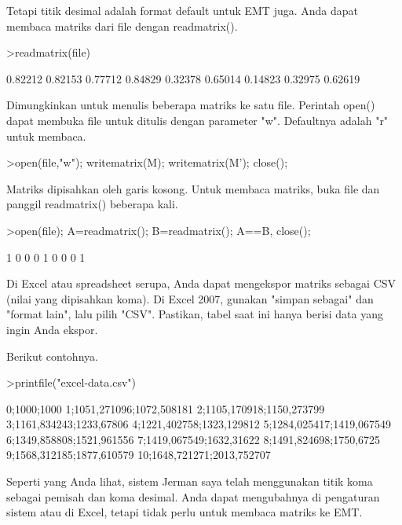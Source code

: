 \documentclass[a4paper,10pt]{article}
\begin{document}
\begin{eulernotebook}
\begin{eulercomment}
\begin{eulercomment}
\begin{eulercomment}
\begin{eulercomment}
\begin{eulercomment}
\begin{eulercomment}
\begin{eulercomment}
Tetapi titik desimal adalah format default untuk EMT juga. Anda dapat
membaca matriks dari file dengan readmatrix().
\end{eulercomment}
\begin{eulerprompt}
>readmatrix(file)
\end{eulerprompt}
\begin{euleroutput}
    0.82212   0.82153   0.77712 
    0.84829   0.32378   0.65014 
    0.14823   0.32975   0.62619 
\end{euleroutput}
\begin{eulercomment}
Dimungkinkan untuk menulis beberapa matriks ke satu file. Perintah
open() dapat membuka file untuk ditulis dengan parameter "w".
Defaultnya adalah "r" untuk membaca.
\end{eulercomment}
\begin{eulerprompt}
>open(file,"w"); writematrix(M); writematrix(M'); close();
\end{eulerprompt}
\begin{eulercomment}
Matriks dipisahkan oleh garis kosong. Untuk membaca matriks, buka file
dan panggil readmatrix() beberapa kali.
\end{eulercomment}
\begin{eulerprompt}
>open(file); A=readmatrix(); B=readmatrix(); A==B, close();
\end{eulerprompt}
\begin{euleroutput}
          1         0         0 
          0         1         0 
          0         0         1 
\end{euleroutput}
\begin{eulercomment}
Di Excel atau spreadsheet serupa, Anda dapat mengekspor matriks
sebagai CSV (nilai yang dipisahkan koma). Di Excel 2007, gunakan
"simpan sebagai" dan "format lain", lalu pilih "CSV". Pastikan, tabel
saat ini hanya berisi data yang ingin Anda ekspor.

Berikut contohnya.
\end{eulercomment}
\begin{eulerprompt}
>printfile("excel-data.csv")
\end{eulerprompt}
\begin{euleroutput}
  0;1000;1000
  1;1051,271096;1072,508181
  2;1105,170918;1150,273799
  3;1161,834243;1233,67806
  4;1221,402758;1323,129812
  5;1284,025417;1419,067549
  6;1349,858808;1521,961556
  7;1419,067549;1632,31622
  8;1491,824698;1750,6725
  9;1568,312185;1877,610579
  10;1648,721271;2013,752707
\end{euleroutput}
\begin{eulercomment}
Seperti yang Anda lihat, sistem Jerman saya telah menggunakan titik
koma sebagai pemisah dan koma desimal. Anda dapat mengubahnya di
pengaturan sistem atau di Excel, tetapi tidak perlu untuk membaca
matriks ke EMT.


\end{eulercomment}
\end{eulercomment}
\end{eulercomment}
\end{eulercomment}
\end{eulercomment}
\end{eulercomment}
\end{eulercomment}
\end{eulernotebook}
\end{document}
